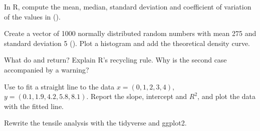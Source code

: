 \begin{exercises}
\item In R, compute the mean, median, standard deviation and coefficient of variation of
  the values in  ().
\item Create a vector of 1000 normally distributed random numbers with mean 275 and
  standard deviation 5 (). Plot a histogram and add the theoretical density
  curve.
\item What do  and
   return? Explain R's recycling rule. Why is the second
  case accompanied by a warning?
\item Use  to fit a straight line to the data $x = (0, 1, 2, 3, 4)$,
  $y = (0.1, 1.9, 4.2, 5.8, 8.1)$. Report the slope, intercept and $R^2$, and plot the data
  with the fitted line.
\item Rewrite the tensile analysis with the tidyverse and ggplot2.
\end{exercises}
